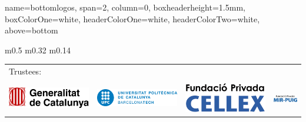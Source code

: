 \documentclass[a0paper,portrait]{baposter}
\begin{document}
\begin{poster}


\headerbox{}
{name=bottomlogos, span=2, column=0, boxheaderheight=1.5mm, boxColorOne=white, headerColorOne=white, headerColorTwo=white, above=bottom}{
\newlength{\logoheight}
\setlength{\logoheight}{6mm}
\begin{center}
\setlength{\tabcolsep}{0mm}

\begin{tabular}{m{} m{} m{}}
\begin{tabular}{llll}
\multicolumn{4}{l}{\color{icfoblue} \small Trustees: }
\\ \arrayrulecolor{icfoblue}\hline
&&& \\[-2mm]
\includegraphics[height=\logoheight]{Logos/GeneralitatDeCatalunya.png} & \hspace{2mm}
\includegraphics[height=\logoheight]{Logos/UPC.png} & \hspace{2mm}
\includegraphics[height=\logoheight]{Logos/Fundacio-CELLEX.png} & \hspace{2mm}
\includegraphics[height=\logoheight]{Logos/Fundacio-Mir-Puig.png} 

\end{tabular}
\end{tabular}
\end{center}}
\end{poster}
\end{document}
